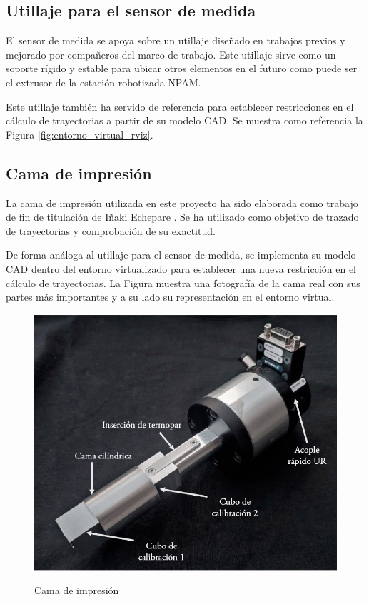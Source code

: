 \subsection{Utillaje para el sensor de medida}
El sensor de medida se apoya sobre un utillaje diseñado en trabajos previos \cite{TFM_SanchoAmparo} y mejorado por compañeros del marco de trabajo. Este utillaje sirve como un soporte rígido y estable para ubicar otros elementos en el futuro como puede ser el extrusor de la estación robotizada \acrshort{NPAM}.

Este utillaje también ha servido de referencia para establecer restricciones en el cálculo de trayectorias a partir de su modelo \acrshort{CAD}. Se muestra como referencia la Figura \ref{fig:entorno_virtual_rviz}.

\subsection{Cama de impresión}
La cama de impresión utilizada en este proyecto ha sido elaborada como trabajo de fin de titulación de Iñaki Echepare \cite{TFM_IñakiEchepare}. Se ha utilizado como objetivo de trazado de trayectorias y comprobación de su exactitud. 

De forma análoga al utillaje para el sensor de medida, se implementa su modelo \acrshort{CAD} dentro del entorno virtualizado para establecer una nueva restricción en el cálculo de trayectorias. La Figura muestra una fotografía de la cama real con sus partes más importantes y a su lado su representación en el entorno virtual.

\begin{figure}[h!]
    \centering
    \includegraphics[scale=0.4]{figuras/cama_impresion_real.jpg}
    \label{fig:cama_impresion_real}
    \caption{Cama de impresión \cite{TFM_IñakiEchepare}}
\end{figure}

